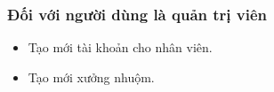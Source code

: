 \subsubsection{Đối với người dùng là quản trị viên}
\begin{itemize}
    \item Tạo mới tài khoản cho nhân viên.
    \item Tạo mới xưởng nhuộm.
\end{itemize}
